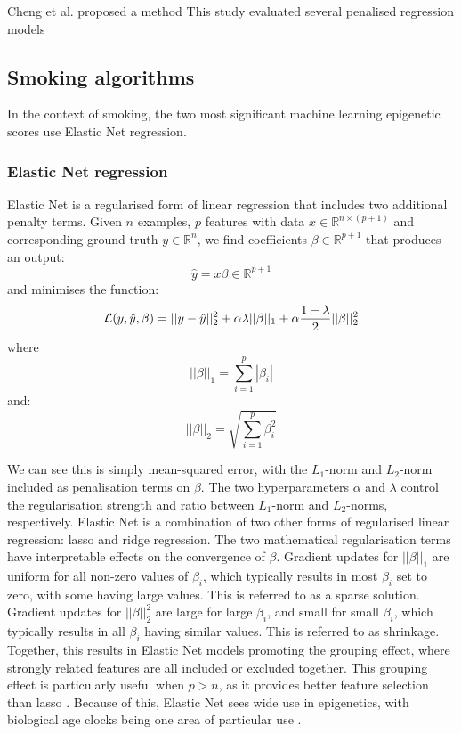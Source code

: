 \documentclass[draft]{article}
\newcommand{\equationname}[1]{%
    \begingroup
        \leavevmode
        \addcontentsline{equ}{equations}{\protect\numberline{\theequation}#1}%
    \endgroup   
}
\begin{document}
Cheng et al. \cite{cheng2023development} proposed a method 
This study evaluated several penalised regression models 

\subsection{Smoking algorithms}
In the context of smoking, the two most significant machine learning epigenetic scores use Elastic Net regression.

\subsubsection{Elastic Net regression} \label{sec:lin-elastic-net}
Elastic Net \cite{zou2005regularization} is a regularised form of linear regression that includes two additional penalty terms.
Given \(n\) examples, \(p\) features with data \(x \in \mathbb{R}^{n \times (p + 1)}\) and corresponding ground-truth \(y \in \mathbb{R}^n\), we find coefficients \(\beta \in \mathbb{R}^{p + 1}\) that produces an output:
\[\hat{y} = x \beta \in \mathbb{R}^{p + 1}\]
and minimises the function:
\begin{equation} \equationname{Elastic Net linear regression} \label{eqn:lin_elastic_net}
    \mathcal{L}(y, \hat{y}, \beta) = ||y - \hat{y}||_2^2 + \alpha\lambda||\beta||_1 + \alpha\frac{1 - \lambda}{2}||\beta||_2^2
\end{equation}
where
\[||\beta||_1 = \sum_{i=1}^{p} |\beta_i|\]
and:
\[||\beta||_2 = \sqrt{\sum_{i=1}^{p} \beta_i^2}\]

We can see this is simply mean-squared error, with the \(L_1\)-norm and \(L_2\)-norm included as penalisation terms on \(\beta\). The two hyperparameters \(\alpha\) and \(\lambda\) control the regularisation strength and ratio between \(L_1\)-norm and \(L_2\)-norms, respectively. Elastic Net is a combination of two other forms of regularised linear regression: lasso \cite{tibshirani1996regression} and ridge \cite{hoerl1970ridge} regression. The two mathematical regularisation terms have interpretable effects on the convergence of \(\beta\). Gradient updates for \(||\beta||_1\) are uniform for all non-zero values of \(\beta_i\), which typically results in most \(\beta_i\) set to zero, with some having large values. This is referred to as a sparse solution. Gradient updates for \(||\beta||_2^2\) are large for large \(\beta_i\), and small for small \(\beta_i\), which typically results in all \(\beta_i\) having similar values. This is referred to as shrinkage. Together, this results in Elastic Net models promoting the grouping effect, where strongly related features are all included or excluded together. This grouping effect is particularly useful when \(p > n\), as it provides better feature selection than lasso \cite{zou2005regularization}. Because of this, Elastic Net sees wide use in epigenetics, with biological age clocks being one area of particular use \cite{teschendorff2025epigenetic}.
\end{document}
